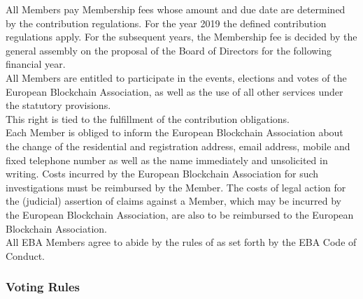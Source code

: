\documentclass{article}
\begin{document}
All Members pay Membership fees whose amount and due date are determined by the contribution regulations. 
For the year 2019 the defined contribution regulations apply. 
For the subsequent years, the Membership fee is decided by the general assembly on the proposal of the Board of Directors for the following financial year.  \\
All Members are entitled to participate in the events, elections and votes of the European Blockchain Association, as well as the use of all other services under the statutory provisions. \\
This right is tied to the fulfillment of the contribution obligations. \\
Each Member is obliged to inform the European Blockchain Association about the change of the residential and registration address, email address, mobile and fixed telephone number as well as the name immediately and unsolicited in writing. 
Costs incurred by the European Blockchain Association for such investigations must be reimbursed by the Member. 
The costs of legal action for the (judicial) assertion of claims against a Member, which may be incurred by the European Blockchain Association, are also to be reimbursed to the European Blockchain Association. \\

All EBA Members agree to abide by the rules of as set forth by the EBA Code of Conduct.

\subsubsection{Voting Rules}
\end{document}

